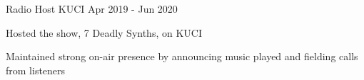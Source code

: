 
\begin{cventries}
	 \cventry
	 {Radio Host}
	 {KUCI}
	 {}
	 {Apr 2019 - Jun 2020}
	 {
	 	\begin{cvitems}
	 		\item {Hosted the show, 7 Deadly Synths, on KUCI}
	 		\item {Maintained strong on-air presence by announcing music played and fielding calls from listeners}
	 	\end{cvitems}
	 }
	
\end{cventries}
